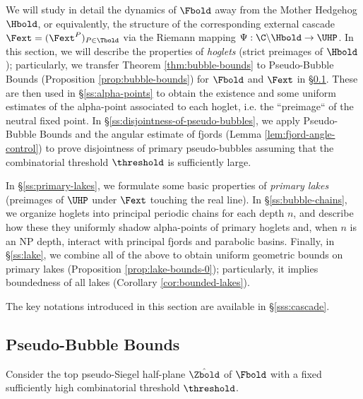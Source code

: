 \documentclass{amsart}
\begin{document}
We will study in detail the dynamics of $\Fbold$ away from the Mother Hedgehog $\Hbold$, or equivalently, the structure of the corresponding external cascade $\Fext = (\Fext^P)_{P \in \Tbold}$ via the Riemann mapping $\Psi: \C \backslash \Hbold \to \UHP$. 
In this section, we will describe the properties of \emph{hoglets} (strict preimages of $\Hbold$); particularly, we transfer Theorem \ref{thm:bubble-bounds} to Pseudo-Bubble Bounds (Proposition \ref{prop:bubble-bounds}) for $\Fbold$ and $\Fext$ in \S\ref{ss:bubbles-and-pseudo-bubbles}.
These are then used in \S\ref{ss:alpha-points} to obtain the existence and some uniform estimates of the alpha-point associated to each hoglet, i.e. the ``preimage`` of the neutral fixed point.
In \S\ref{ss:disjointness-of-pseudo-bubbles}, we apply Pseudo-Bubble Bounds and the angular estimate of fjords (Lemma \ref{lem:fjord-angle-control}) to prove disjointness of primary pseudo-bubbles assuming that the combinatorial threshold $\threshold$ is sufficiently large.

In \S\ref{ss:primary-lakes}, we formulate some basic properties of \emph{primary lakes} (preimages of $\UHP$ under $\Fext$ touching the real line).
In \S\ref{ss:bubble-chains}, we organize hoglets into principal periodic chains for each depth $n$, and describe how these they uniformly shadow alpha-points of primary hoglets and, when $n$ is an NP depth, interact with principal fjords and parabolic basins.
Finally, in \S\ref{ss:lake}, we combine all of the above to obtain uniform geometric bounds on primary lakes (Proposition \ref{prop:lake-bounds-0}); particularly, it implies boundedness of all lakes (Corollary \ref{cor:bounded-lakes}).


The key notations introduced in this section are available in \S\ref{sss:cascade}.



\subsection{Pseudo-Bubble Bounds}
\label{ss:bubbles-and-pseudo-bubbles}

Consider the top pseudo-Siegel half-plane $\hat{\Zbold}$ of $\Fbold$ with a fixed sufficiently high combinatorial threshold $\threshold$.
\end{document}
